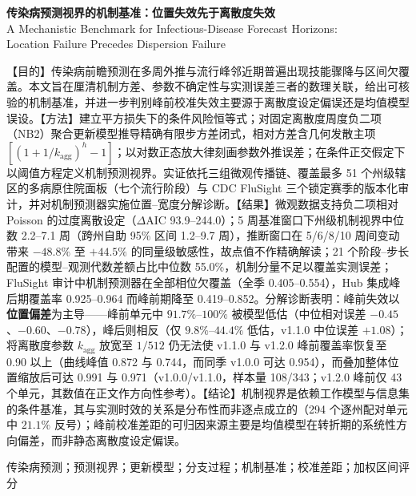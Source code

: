 \documentclass[10pt,UTF8,a4paper,zihao=-4]{ctexart}
\theoremstyle{plain}
\theoremstyle{definition}
\theoremstyle{remark}
\begin{document}
\setcounter{section}{-1}

\begin{center}
    \vspace*{-0.6em}
    {\heiti\bfseries 传染病预测视界的机制基准：位置失效先于离散度失效} \\[0.5em]
    {\kaishu A Mechanistic Benchmark for Infectious-Disease Forecast Horizons:\\ Location Failure Precedes Dispersion Failure}
\end{center}

{\small
{}【目的】传染病前瞻预测在多周外推与流行峰邻近期普遍出现技能骤降与区间欠覆盖。本文旨在厘清机制方差、参数不确定性与实测误差三者的数理关联，给出可核验的机制基准，并进一步判别峰前校准失效主要源于离散度设定偏误还是均值模型误设。【方法】建立平方损失下的条件风险恒等式；对固定离散度周度负二项（NB2）聚合更新模型推导精确有限步方差闭式，相对方差含几何发散主项 $[(1+1/k_{\text{agg}})^h-1]$；以对数正态放大律刻画参数外推误差；在条件正交假定下以阈值方程定义机制预测视界。实证依托三组微观传播链、覆盖最多 51 个州级辖区的多病原住院面板（七个流行阶段）与 CDC FluSight 三个锁定赛季的版本化审计，并对机制预测器实施位置--宽度分解诊断。【结果】微观数据支持负二项相对 Poisson 的过度离散设定（$\Delta\text{AIC}$ 93.9--244.0）；5 周基准窗口下州级机制视界中位数 2.2--7.1 周（跨州自助 95\% 区间 1.2--9.7 周），推断窗口在 5/6/8/10 周间变动带来 $-48.8\%$ 至 $+44.5\%$ 的同量级敏感性，故点值不作精确解读；21 个阶段--步长配置的模型--观测代数差额占比中位数 55.0\%，机制分量不足以覆盖实测误差；FluSight 审计中机制预测器在全部相位欠覆盖（全季 0.405--0.554），Hub 集成峰后期覆盖率 0.925--0.964 而峰前期降至 0.419--0.852。分解诊断表明：峰前失效以\textbf{位置偏差}为主导——峰前单元中 $91.7\%\text{--}100\%$ 被模型低估（中位相对误差 $-0.45$、$-0.60$、$-0.78$），峰后则相反（仅 $9.8\%\text{--}44.4\%$ 低估，v1.1.0 中位误差 $+1.08$）；将离散度参数 $k_{\text{agg}}$ 放宽至 $1/512$ 仍无法使 v1.1.0 与 v1.2.0 峰前覆盖率恢复至 0.90 以上（曲线峰值 0.872 与 0.744，而同季 v1.0.0 可达 0.954），而叠加整体位置缩放后可达 0.991 与 0.971（v1.0.0/v1.1.0，样本量 108/343；v1.2.0 峰前仅 43 个单元，其数值在正文作方向性参考）。【结论】机制视界是依赖工作模型与信息集的条件基准，其与实测时效的关系是分布性而非逐点成立的（294 个逐州配对单元中 $21.1\%$ 反号）；峰前校准差距的可归因来源主要是均值模型在转折期的系统性方向偏差，而非静态离散度设定偏误。

\vspace{0.3em}
传染病预测；预测视界；更新模型；分支过程；机制基准；校准差距；加权区间评分
}
\end{document}
